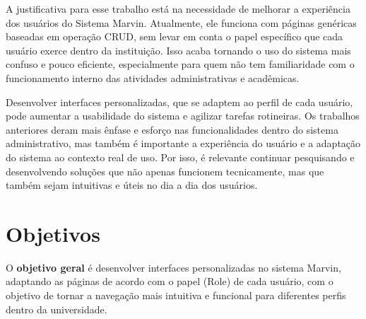 A justificativa para esse trabalho está na necessidade de melhorar a experiência dos usuários do Sistema Marvin. Atualmente, ele funciona com páginas genéricas baseadas em operação CRUD, sem levar em conta o papel específico que cada usuário exerce dentro da instituição. Isso acaba tornando o uso do sistema mais confuso e pouco eficiente, especialmente para quem não tem familiaridade com o funcionamento interno das atividades administrativas e acadêmicas.

Desenvolver interfaces personalizadas, que se adaptem ao perfil de cada usuário, pode aumentar a usabilidade do sistema e agilizar tarefas rotineiras. Os trabalhos anteriores deram mais ênfase e esforço nas funcionalidades dentro do sistema administrativo, mas também é importante a experiência do usuário e a adaptação do sistema ao contexto real de uso. Por isso, é relevante continuar pesquisando e desenvolvendo soluções que não apenas funcionem tecnicamente, mas que também sejam intuitivas e úteis no dia a dia dos usuários.

\section{Objetivos}
\label{sec-intro-obj}



O \textbf{objetivo geral} é desenvolver interfaces personalizadas no sistema Marvin, adaptando as páginas de acordo com o papel (Role) de cada usuário, com o objetivo de tornar a navegação mais intuitiva e funcional para diferentes perfis dentro da universidade.



